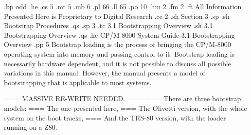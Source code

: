 .bp odd
.he
.cs 5
.mt 5
.mb 6
.pl 66
.ll 65
.po 10
.hm 2
.fm 2
.ft All Information Presented Here is Proprietary to Digital Research
.ce 2
.sh
Section 3
.sp
.sh
Bootstrap Procedures
.qs
.sp 3
.tc    3.1  Bootstrapping Overview
.sh
3.1  Bootstrapping Overview
.qs
.he CP/M-8000 System Guide                 3.1  Bootstrapping Overview
.pp 5
Bootstrap loading is the process of bringing the CP/M-8000 operating system
into memory and passing control to it.  Bootstrap loading is necessarily
hardware dependent, and it is not possible to discuss all possible variations
in this manual.  However, the manual presents a model of bootstrapping that is
applicable to most systems.

=== MASSIVE RE-WRITE NEEDED. ===
=== 	There are three bootstrap models:
===	The one presented here,
===	The Olivetti version, with the whole system on the boot tracks,
===	And the TRS-80 version, with the loader running on a Z80.
 
